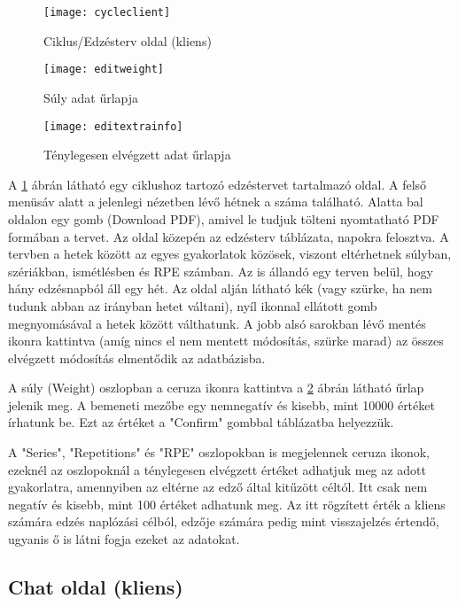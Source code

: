\begin{figure}[H]
	\centering
	\texttt{[image: cycleclient]}
	\caption{Ciklus/Edzésterv oldal (kliens)}
	\label{fig:cycleclient}
\end{figure}

\begin{figure}[H]
	\centering
	\texttt{[image: editweight]}
	\caption{Súly adat űrlapja}
	\label{fig:editweight}
\end{figure}

\begin{figure}[H]
	\centering
	\texttt{[image: editextrainfo]}
	\caption{Ténylegesen elvégzett adat űrlapja}
	\label{fig:editextrainfo}
\end{figure}

A \ref{fig:cycleclient} ábrán látható egy ciklushoz tartozó edzéstervet tartalmazó oldal. A felső menüsáv alatt a jelenlegi nézetben lévő hétnek a száma található. Alatta bal oldalon egy gomb (Download PDF), amivel le tudjuk tölteni nyomtatható PDF formában a tervet. Az oldal közepén az edzésterv táblázata, napokra felosztva. A tervben a hetek között az egyes gyakorlatok közösek, viszont eltérhetnek súlyban, szériákban, ismétlésben és RPE számban. Az is állandó egy terven belül, hogy hány edzésnapból áll egy hét. Az oldal alján látható kék (vagy szürke, ha nem tudunk abban az irányban hetet váltani), nyíl ikonnal ellátott gomb megnyomásával a hetek között válthatunk. A jobb alsó sarokban lévő mentés ikonra kattintva (amíg nincs el nem mentett módosítás, szürke marad) az összes elvégzett módosítás elmentődik az adatbázisba.

A súly (Weight) oszlopban a ceruza ikonra kattintva a \ref{fig:editweight} ábrán látható űrlap jelenik meg. A bemeneti mezőbe egy nemnegatív és kisebb, mint 10000 értéket írhatunk be. Ezt az értéket a "Confirm" gombbal táblázatba helyezzük.

A "Series", "Repetitions" és "RPE" oszlopokban is megjelennek ceruza ikonok, ezeknél az oszlopoknál a ténylegesen elvégzett értéket adhatjuk meg az adott gyakorlatra, amennyiben az eltérne az edző által kitűzött céltól. Itt csak nem negatív és kisebb, mint 100 értéket adhatunk meg. Az itt rögzített érték a kliens számára edzés naplózási célból, edzője számára pedig mint visszajelzés értendő, ugyanis ő is látni fogja ezeket az adatokat.

\subsection{Chat oldal (kliens)}

